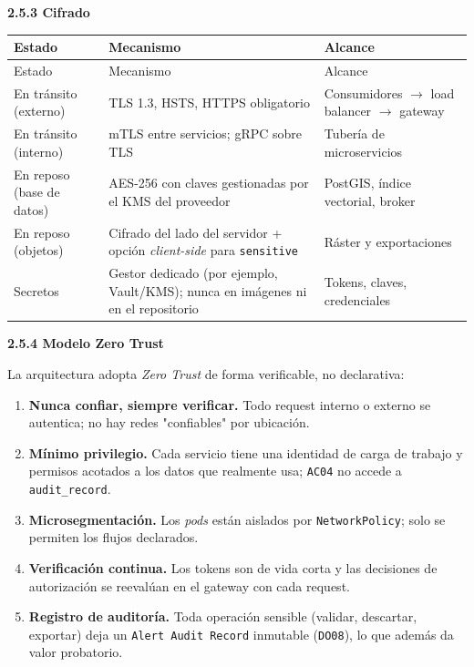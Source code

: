 \documentclass{article}
\newcommand{\mdhfour}[1]{\par\medskip\noindent\textbf{#1}\par\nobreak\smallskip}
\begin{document}
\mdhfour{2.5.3 Cifrado}

{\small
\begin{longtable}{@{}L{1.07in}L{3.37in}L{1.65in}@{}}
\toprule
Estado & Mecanismo & Alcance \\
\midrule
\endfirsthead
\toprule
Estado & Mecanismo & Alcance \\
\midrule
\endhead
\bottomrule
\endlastfoot
En tránsito (externo) & TLS 1.3, HSTS, HTTPS obligatorio & Consumidores \ensuremath{\rightarrow} load balancer \ensuremath{\rightarrow} gateway \\
En tránsito (interno) & mTLS entre servicios; gRPC sobre TLS & Tubería de microservicios \\
En reposo (base de datos) & AES-256 con claves gestionadas por el KMS del proveedor & PostGIS, índice vectorial, broker \\
En reposo (objetos) & Cifrado del lado del servidor + opción \emph{client-side} para \texttt{sensitive} & Ráster y exportaciones \\
Secretos & Gestor dedicado (por ejemplo, Vault/KMS); nunca en imágenes ni en el repositorio & Tokens, claves, credenciales \\
\end{longtable}
}

\mdhfour{2.5.4 Modelo Zero Trust}

La arquitectura adopta \emph{Zero Trust} de forma verificable, no declarativa:

\begin{enumerate}
  \item \textbf{Nunca confiar, siempre verificar.} Todo request \textemdash{}interno o externo\textemdash{} se autentica; no hay redes "confiables" por ubicación.
  \item \textbf{Mínimo privilegio.} Cada servicio tiene una identidad de carga de trabajo y permisos acotados a los datos que realmente usa; \texttt{AC04} no accede a \texttt{audit\_\allowbreak{}record}.
  \item \textbf{Microsegmentación.} Los \emph{pods} están aislados por \texttt{NetworkPolicy}; solo se permiten los flujos declarados.
  \item \textbf{Verificación continua.} Los tokens son de vida corta y las decisiones de autorización se reevalúan en el gateway con cada request.
  \item \textbf{Registro de auditoría.} Toda operación sensible (validar, descartar, exportar) deja un \texttt{Alert Audit Record} inmutable (\texttt{DO08}), lo que además da valor probatorio.
\end{enumerate}
\end{document}
